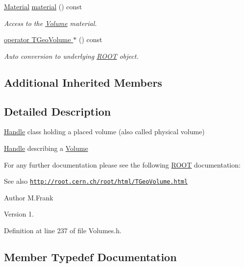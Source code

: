 \begin{DoxyCompactItemize}
\hyperlink{class_d_d4hep_1_1_geometry_1_1_material}{Material} \hyperlink{class_d_d4hep_1_1_geometry_1_1_volume_a4b2c5449e20041a2d917404c1353d355}{material} () const
\begin{DoxyCompactList}\small\item\em Access to the \hyperlink{class_d_d4hep_1_1_geometry_1_1_volume}{Volume} material. \end{DoxyCompactList}\item 
\hyperlink{class_d_d4hep_1_1_geometry_1_1_volume_a6a5460b989e24aa70149574c437f48cd}{operator T\+Geo\+Volume $\ast$} () const
\begin{DoxyCompactList}\small\item\em Auto conversion to underlying \hyperlink{namespace_r_o_o_t}{R\+O\+OT} object. \end{DoxyCompactList}\end{DoxyCompactItemize}
\subsection*{Additional Inherited Members}


\subsection{Detailed Description}
\hyperlink{class_d_d4hep_1_1_handle}{Handle} class holding a placed volume (also called physical volume) 

\hyperlink{class_d_d4hep_1_1_handle}{Handle} describing a \hyperlink{class_d_d4hep_1_1_geometry_1_1_volume}{Volume}

For any further documentation please see the following \hyperlink{namespace_r_o_o_t}{R\+O\+OT} documentation\+: \begin{DoxySeeAlso}{See also}
\href{http://root.cern.ch/root/html/TGeoVolume.html}{\tt http\+://root.\+cern.\+ch/root/html/\+T\+Geo\+Volume.\+html}
\end{DoxySeeAlso}
\begin{DoxyAuthor}{Author}
M.\+Frank 
\end{DoxyAuthor}
\begin{DoxyVersion}{Version}
1. 
\end{DoxyVersion}


Definition at line 237 of file Volumes.\+h.



\subsection{Member Typedef Documentation}
\hypertarget{class_d_d4hep_1_1_geometry_1_1_volume_ac9545eb97e81ed894b7192a26e4ef5a9}{}\label{class_d_d4hep_1_1_geometry_1_1_volume_ac9545eb97e81ed894b7192a26e4ef5a9} 
